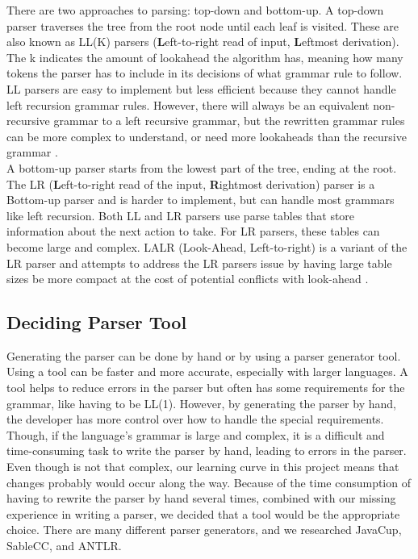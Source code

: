 \noindent
There are two approaches to parsing: top-down and bottom-up. A top-down parser traverses the tree from the root node until each leaf is visited. These are also known as LL(K) parsers (\textbf{L}eft-to-right read of input, \textbf{L}eftmost derivation). The k indicates the amount of lookahead the algorithm has, meaning how many tokens the parser has to include in its decisions of what grammar rule to follow. LL parsers are easy to implement but less efficient because they cannot handle left recursion grammar rules. However, there will always be an equivalent non-recursive grammar to a left recursive grammar, but the rewritten grammar rules can be more complex to understand, or need more lookaheads than the recursive grammar \cite{ParsingGuide}. \\

A bottom-up parser starts from the lowest part of the tree, ending at the root. The LR (\textbf{L}eft-to-right read of the input, \textbf{R}ightmost derivation) parser is a Bottom-up parser and is harder to implement, but can handle most grammars like left recursion. Both LL and LR parsers use parse tables that store information about the next action to take. For LR parsers, these tables can become large and complex. LALR (Look-Ahead, Left-to-right) is a variant of the LR parser and attempts to address the LR parsers issue by having large table sizes be more compact at the cost of potential conflicts with look-ahead \cite{ParsingGuide}. 

\subsection{Deciding Parser Tool}
Generating the parser can be done by hand or by using a parser generator tool. Using a tool can be faster and more accurate, especially with larger languages. A tool helps to reduce errors in the parser but often has some requirements for the grammar, like having to be LL(1). However, by generating the parser by hand, the developer has more control over how to handle the special requirements. Though, if the language's grammar is large and complex, it is a difficult and time-consuming task to write the parser by hand, leading to errors in the parser. Even though \lang is not that complex, our learning curve in this project means that changes probably would occur along the way. Because of the time consumption of having to rewrite the parser by hand several times, combined with our missing experience in writing a parser, we decided that a tool would be the appropriate choice. There are many different parser generators, and we researched JavaCup, SableCC, and ANTLR. \\

